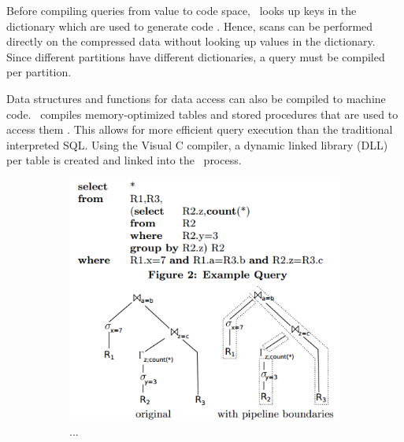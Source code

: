 Before compiling queries from value to code space, \blink~looks up keys in the dictionary which are used to generate code \cite{Barber2012-xt}. Hence, scans can be performed directly on the compressed data without looking up values in the dictionary. Since different partitions have different dictionaries, a query must be compiled per partition. 

Data structures and functions for data access can also be compiled to machine code. \mssql~compiles memory-optimized tables and stored procedures that are used to access them \cite{Delaney2014-ip}. This allows for more efficient query execution than the traditional interpreted SQL. Using the Visual C compiler, a dynamic linked library (DLL) per table is created and linked into the \mssql~process.

\begin{figure}
  \centering
  \begin{subfigure}{0.45\textwidth}
    \includegraphics[width=\textwidth]{img/pipeline-boundary-1.png}
    \caption{...}
    \label{fig:pipeline-boundary-1} 
  \end{subfigure}
  \begin{subfigure}{0.45\textwidth}

\end{subfigure}
\end{figure}
